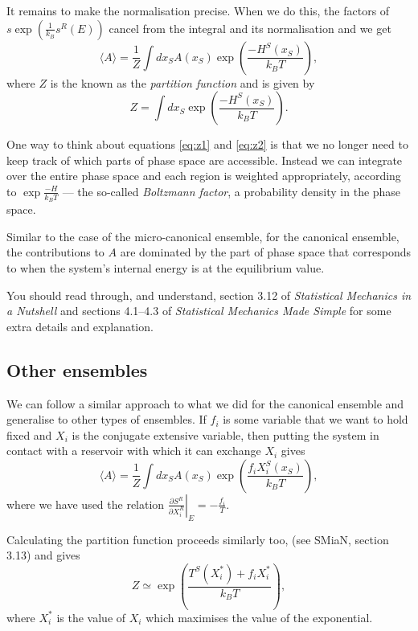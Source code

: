 It remains to make the normalisation precise. When we do this, the factors of $s\exp\left(\frac{1}{k_B}s^R(E)\right)$ cancel from the integral and its normalisation and we get
\begin{equation}
	\langle A\rangle = \frac{1}{Z}\int dx_SA(x_S)\exp\left(\frac{-H^S(x_S)}{k_BT}\right),
	\label{eq:z1}
\end{equation}
where $Z$ is the known as the \emph{partition function} and is given by
\begin{equation}
	Z = \int dx_S\exp\left(\frac{-H^S(x_S)}{k_BT}\right).
	\label{eq:z2}
\end{equation}

One way to think about equations \ref{eq:z1} and \ref{eq:z2} is that we no longer need to keep track of which parts of phase space are accessible. Instead we can integrate over the entire phase space and each region is weighted appropriately, according to $\exp\frac{-H}{k_BT}$ --- the so-called \emph{Boltzmann factor}, a probability density in the phase space.

Similar to the case of the micro-canonical ensemble, for the canonical ensemble, the contributions to $A$ are dominated by the part of phase space that corresponds to when the system's internal energy is at the equilibrium value. 

You should read through, and understand, section 3.12 of \emph{Statistical Mechanics in a Nutshell} and sections 4.1--4.3 of \emph{Statistical Mechanics Made Simple} for some extra details and explanation.

\subsection*{Other ensembles}
We can follow a similar approach to what we did for the canonical ensemble and generalise to other types of ensembles. If $f_i$ is some variable that we want to hold fixed and $X_i$ is the conjugate extensive variable, then putting the system in contact with a reservoir with which it can exchange $X_i$ gives
\begin{equation*}
	\langle A\rangle = \frac{1}{Z}\int dx_SA(x_S)\exp\left(\frac{f_iX^S_i(x_S)}{k_BT}\right),
\end{equation*}
where we have used the relation $\left.\frac{\partial S^R}{\partial X_i^R}\right|_E=-\frac{f_i}{T}$.

Calculating the partition function proceeds similarly too, (see SMiaN, section 3.13) and gives
\begin{equation*}
	Z \simeq \exp\left(\frac{T^S(X_i^*)+f_iX_i^*}{k_BT}\right),
\end{equation*}
where $X_i^*$ is the value of $X_i$ which maximises the value of the exponential.

